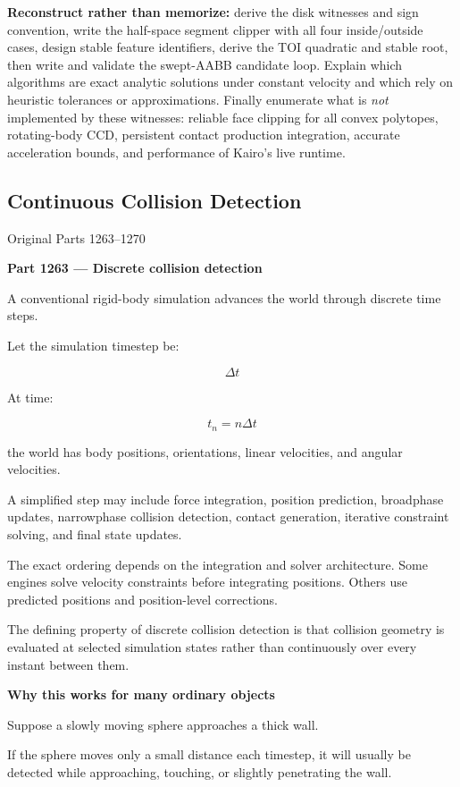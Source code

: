 \textbf{Reconstruct rather than memorize:} derive the disk witnesses and sign convention, write the half-space segment clipper with all four inside/outside cases, design stable feature identifiers, derive the TOI quadratic and stable root, then write and validate the swept-AABB candidate loop. Explain which algorithms are exact analytic solutions under constant velocity and which rely on heuristic tolerances or approximations. Finally enumerate what is \emph{not} implemented by these witnesses: reliable face clipping for all convex polytopes, rotating-body CCD, persistent contact production integration, accurate acceleration bounds, and performance of Kairo's live runtime.

\subsection{Continuous Collision Detection}\label{04-visual-computing-ii-ch026-continuous-collision-detection}

Original Parts 1263--1270

\textbf{Part 1263 --- Discrete collision detection}

A conventional rigid-body simulation advances the world through discrete time steps.

Let the simulation timestep be:

\[
\Delta t
\]

At time:

\[
t_n=n\Delta t
\]

the world has body positions, orientations, linear velocities, and angular velocities.

A simplified step may include force integration, position prediction, broadphase updates, narrowphase collision detection, contact generation, iterative constraint solving, and final state updates.

The exact ordering depends on the integration and solver architecture. Some engines solve velocity constraints before integrating positions. Others use predicted positions and position-level corrections.

The defining property of discrete collision detection is that collision geometry is evaluated at selected simulation states rather than continuously over every instant between them.

\textbf{Why this works for many ordinary objects}

Suppose a slowly moving sphere approaches a thick wall.

If the sphere moves only a small distance each timestep, it will usually be detected while approaching, touching, or slightly penetrating the wall.

